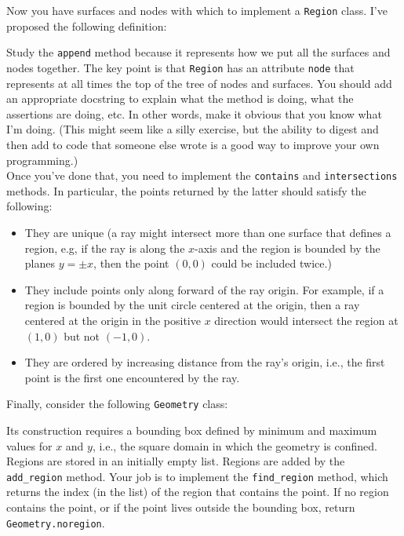 \documentclass[12pt]{article}
\begin{document}
Now you have surfaces and nodes with which to 
implement a {\tt Region} class.  I've proposed the 
following definition:



Study the {\tt append} method because it represents
how we put all the surfaces and nodes together.  The 
key point is that {\tt Region} has an attribute 
{\tt node} that represents at all times the top of 
the tree of nodes and surfaces.  You should add 
an appropriate docstring to explain what the method
is doing, what the assertions are doing, etc.  In 
other words, make it obvious that you know what
I'm doing.  (This might seem like a silly exercise,
but the ability to digest and then add to code
that someone else wrote is a good way to improve
your own programming.) \\

Once you've done that, you need to implement the 
{\tt contains} and {\tt intersections} methods.
In particular, the points returned by the latter
should satisfy the following:
\begin{itemize}
 \item They are unique (a ray might intersect more
       than one surface that defines a region, e.g,
       if the ray is along the $x$-axis and the 
       region is bounded by the planes $y = \pm x$,
       then the point $(0, 0)$ could be included
       twice.)
 \item They include points only along forward of
       the ray origin. For example, if a region
       is bounded by the unit circle centered
       at the origin, then a ray centered at the 
       origin in the positive $x$ direction 
       would intersect the region at  $(1,0)$
       but not $(-1, 0)$.
 \item They are ordered by increasing distance
       from the ray's origin, i.e., the first 
       point is the first one encountered by
       the ray.
\end{itemize}
\vspace{12pt}

Finally, consider the following {\tt Geometry} class:



Its construction requires a bounding box defined 
by minimum and maximum values for $x$ and $y$, i.e.,
the square domain in which the geometry is confined.
Regions are stored in an initially empty list.  Regions
are added by the {\tt add\_region} method.  Your job
is to implement the {\tt find\_region} method, which 
returns the index (in the list) of the region that
contains the point.  If no region contains the point,
or if the point lives outside the bounding box, return
{\tt Geometry.noregion}. \\
\end{document}
